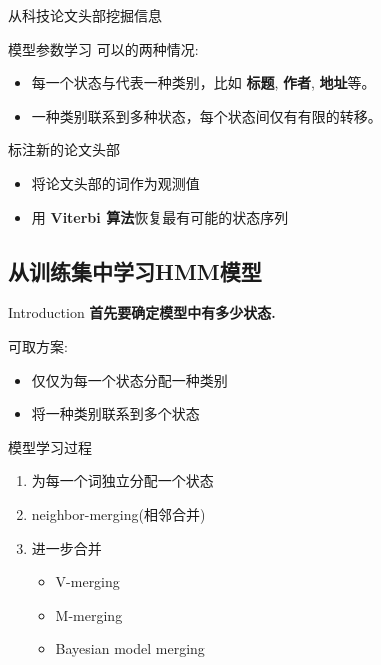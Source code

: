 \documentclass{beamer}
\begin{document}
\begin{frame}{ 从科技论文头部挖掘信息}
    \begin{block}{模型参数学习}
        可以的两种情况:
        \begin{itemize}
            \item 每一个状态与代表一种类别，比如 \textbf{标题}, \textbf{作者}, \textbf{地址}等。
            \item 一种类别联系到多种状态，每个状态间仅有有限的转移。
        \end{itemize}
    \end{block}
    
    \begin{block}{ 标注新的论文头部}
        \begin{itemize}
            \item 将论文头部的词作为观测值
            \item 用 \textbf{Viterbi 算法}恢复最有可能的状态序列
        \end{itemize}
    \end{block}
\end{frame}

\subsection{从训练集中学习HMM模型}
\begin{frame}{Introduction}
    \textbf{首先要确定模型中有多少状态.}
    \begin{block}{可取方案:}
        \begin{itemize}
            \item 仅仅为每一个状态分配一种类别
            \item 将一种类别联系到多个状态
        \end{itemize}
    \end{block}
\end{frame}

\begin{frame}{模型学习过程}
    \begin{enumerate}
        \item 为每一个词独立分配一个状态
        \item neighbor-merging(相邻合并)
        \item 进一步合并
            \begin{itemize}
                \item V-merging
                \item M-merging
                \item Bayesian model merging
            \end{itemize}
    \end{enumerate}
\end{frame}
\end{document}
